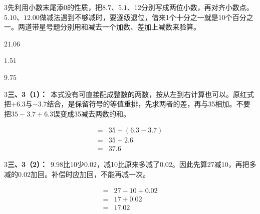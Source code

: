 \documentclass[multi=snippet,border={5bp 20bp 5bp 5bp}]{standalone}
\newenvironment{snippet}[3]{\begin{minipage}{#1bp}\color{answerred}\fontsize{#2}{#3}\selectfont\raggedright}{\end{minipage}}
\begin{document}
\begin{snippet}{505}{11.5}{14}\begin{multicols}{3}\raggedcolumns 先利用小数末尾添0的性质，把\(8.7\)\allowbreak 、\(5.1\)\allowbreak 、12分别写成两位小数，再对齐小数点。\(5.10\)\allowbreak 、\(12.00\)\allowbreak 做减法遇到不够减时，要逐级退位，借来1个十分之一就是10个百分之一。两道带星号题分别用和减去一个加数、差加上减数来验算。\end{multicols}\end{snippet}
\begin{snippet}{37.0}{10.5}{14}\SourceSans\setlength{\mathindent}{2bp}\(21.06\)\end{snippet}
\begin{snippet}{37.0}{10.5}{14}\SourceSans\setlength{\mathindent}{2bp}\(1.51\)\end{snippet}
\begin{snippet}{37.0}{10.5}{14}\SourceSans\setlength{\mathindent}{2bp}\(9.75\)\end{snippet}
\begin{snippet}{505}{11.5}{14}\begin{multicols}{3}\raggedcolumns \textbf{三、3（1）：}\ 本式没有可直接配成整数的两数，按从左到右计算也可以。原红式把\(+6.3\)\allowbreak 与\(-3.7\)\allowbreak 结合，是保留符号的等值重排，先求两者的差，再与35相加。不要把\(35-3.7+6.3\)\allowbreak 误变成35减去两数的和。\end{multicols}\end{snippet}
\begin{snippet}{182.0}{10.5}{12.8}\SourceSans\setlength{\mathindent}{2bp}\[\begin{aligned}={}&35+(6.3-3.7)\\={}&35+2.6\\={}&37.6\end{aligned}\]\end{snippet}
\begin{snippet}{505}{11.5}{14}\begin{multicols}{3}\raggedcolumns \textbf{三、3（2）：}\ \(9.98\)\allowbreak 比10少\(0.02\)\allowbreak ，减10比原来多减了\(0.02\)\allowbreak 。因此先算27减10，再把多减的\(0.02\)\allowbreak 加回。补偿时应加回，不能再减一次。\end{multicols}\end{snippet}
\begin{snippet}{232.0}{10.5}{12.8}\SourceSans\setlength{\mathindent}{2bp}\[\begin{aligned}={}&27-10+0.02\\={}&17+0.02\\={}&17.02\end{aligned}\]\end{snippet}
\end{document}
